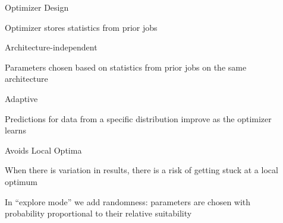 \documentclass[final]{beamer}
\begin{document}
{\begin{frame}{}
\begin{center}
\begin{columns}[t]
\begin{column}{0.32\textwidth}

\vspace{1.2cm}

   
\end{column}

\begin{column}{0.32\textwidth}
 
    \begin{block}{\huge Optimizer Design}
\vspace{.5cm}

{\Large Optimizer stores statistics from prior jobs}
\begin{itemize}{\Large
\item Architecture-independent
\begin{itemize} {\Large
\item Parameters chosen based on statistics from prior jobs on the same architecture
}
\end{itemize}
\vspace{.5cm}

\item Adaptive
\begin{itemize} {\Large
\item Predictions for data from a specific distribution improve as the optimizer learns
}
\end{itemize}
\vspace{.5cm}

\item Avoids Local Optima
\begin{itemize} {\Large
\item When there is variation in results, there is a risk of getting stuck at a local optimum
\item In ``explore mode'' we add randomness: parameters are chosen with probability proportional to their relative suitability
}
	\end{itemize}}
\end{itemize}

\vspace{.7cm}


\end{block}
\end{column}
\end{columns}
\end{center}
\end{frame}}
\end{document}
